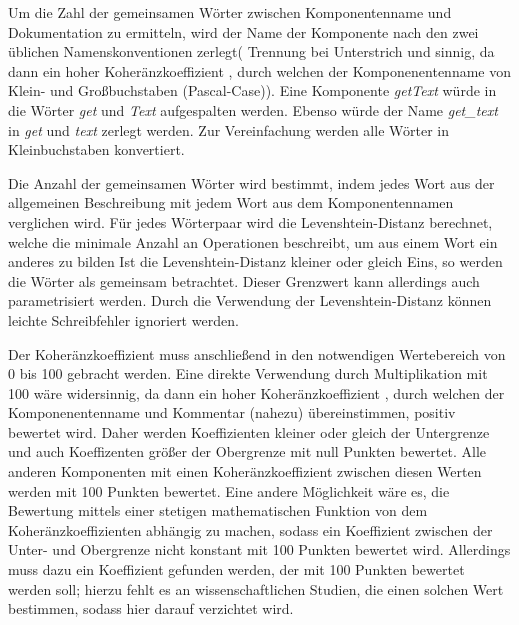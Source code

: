 Um die Zahl der  gemeinsamen Wörter zwischen Komponentenname und Dokumentation zu ermitteln, wird der Name der Komponente nach den zwei üblichen Namenskonventionen zerlegt( Trennung bei Unterstrich und sinnig, da dann ein hoher Koheränzkoeffizient , durch welchen der Komponenentenname von Klein- und Großbuchstaben (Pascal-Case)). Eine Komponente \textit{getText} würde in die Wörter \textit{get} und \textit{Text} aufgespalten werden. Ebenso würde der Name \textit{get\_text} in  \textit{get} und \textit{text} zerlegt werden. Zur Vereinfachung werden alle Wörter in Kleinbuchstaben konvertiert. 

Die Anzahl der gemeinsamen Wörter wird bestimmt, indem jedes Wort aus der allgemeinen Beschreibung mit jedem Wort aus dem Komponentennamen verglichen wird. Für jedes Wörterpaar wird die Levenshtein-Distanz berechnet, welche die minimale Anzahl an Operationen beschreibt, um aus einem Wort ein anderes zu bilden \cite[S. 1091]{ANormalizedLevenshteinDistanceMetric} Ist  die Levenshtein-Distanz kleiner oder gleich Eins, so werden die Wörter als gemeinsam betrachtet. Dieser Grenzwert kann allerdings auch parametrisiert werden. Durch die Verwendung der Levenshtein-Distanz können leichte Schreibfehler ignoriert werden. 

Der Koheränzkoeffizient muss anschließend in den notwendigen Wertebereich von 0 bis 100 gebracht werden. Eine direkte Verwendung durch Multiplikation mit 100 wäre widersinnig, da dann ein hoher Koheränzkoeffizient , durch welchen der Komponenentenname und Kommentar (nahezu) übereinstimmen, positiv bewertet wird. Daher werden Koeffizienten kleiner oder gleich der Untergrenze und auch Koeffizenten größer der Obergrenze mit null Punkten bewertet. Alle anderen Komponenten mit einen Koheränzkoeffizient zwischen diesen Werten werden mit 100 Punkten bewertet. Eine andere Möglichkeit wäre es, die Bewertung mittels einer stetigen mathematischen Funktion von dem Koheränzkoeffizienten abhängig zu machen, sodass ein Koeffizient zwischen der Unter- und Obergrenze nicht konstant mit 100 Punkten bewertet wird. Allerdings muss dazu ein Koeffizient gefunden werden, der mit 100 Punkten bewertet werden soll; hierzu fehlt es an wissenschaftlichen Studien, die einen solchen Wert bestimmen, sodass hier darauf verzichtet wird. 

